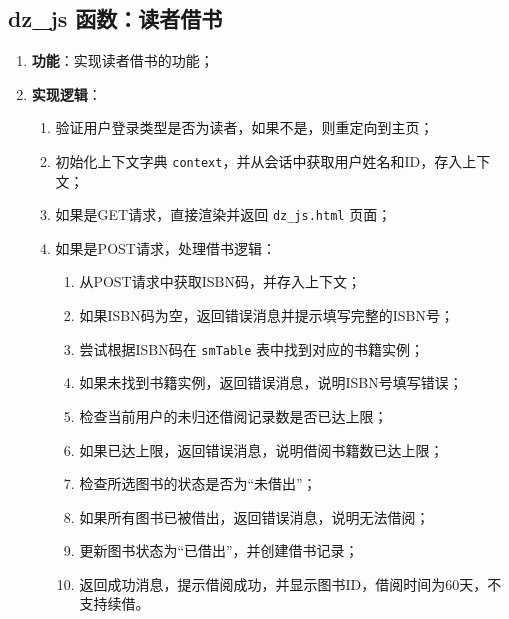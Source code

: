 \documentclass{ctexart}
\begin{document}
\subsection{dz\_js 函数：读者借书}
\begin{enumerate}
    \item \textbf{功能}：实现读者借书的功能；
    \item \textbf{实现逻辑}：
    \begin{enumerate}
        \item 验证用户登录类型是否为读者，如果不是，则重定向到主页；
        \item 初始化上下文字典 \texttt{context}，并从会话中获取用户姓名和ID，存入上下文；
        \item 如果是GET请求，直接渲染并返回 \texttt{dz\_js.html} 页面；
        \item 如果是POST请求，处理借书逻辑：
        \begin{enumerate}
            \item 从POST请求中获取ISBN码，并存入上下文；
            \item 如果ISBN码为空，返回错误消息并提示填写完整的ISBN号；
            \item 尝试根据ISBN码在 \texttt{smTable} 表中找到对应的书籍实例；
            \item 如果未找到书籍实例，返回错误消息，说明ISBN号填写错误；
            \item 检查当前用户的未归还借阅记录数是否已达上限；
            \item 如果已达上限，返回错误消息，说明借阅书籍数已达上限；
            \item 检查所选图书的状态是否为“未借出”；
            \item 如果所有图书已被借出，返回错误消息，说明无法借阅；
            \item 更新图书状态为“已借出”，并创建借书记录；
            \item 返回成功消息，提示借阅成功，并显示图书ID，借阅时间为60天，不支持续借。
        \end{enumerate}
    \end{enumerate}
\end{enumerate}
\end{document}

